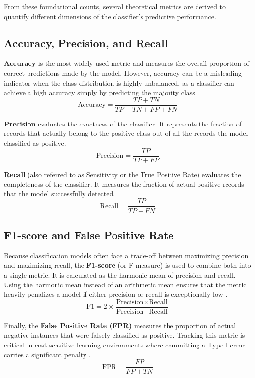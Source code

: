 From these foundational counts, several theoretical metrics are derived to quantify different dimensions of the classifier's predictive performance.

\subsection{Accuracy, Precision, and Recall}
\textbf{Accuracy} is the most widely used metric and measures the overall proportion of correct predictions made by the model. However, accuracy can be a misleading indicator when the class distribution is highly unbalanced, as a classifier can achieve a high accuracy simply by predicting the majority class \cite{tan2019introduction}.
\begin{equation}
    \text{Accuracy} = \frac{TP + TN}{TP + TN + FP + FN}
\end{equation}

\noindent \textbf{Precision} evaluates the exactness of the classifier. It represents the fraction of records that actually belong to the positive class out of all the records the model classified as positive.
\begin{equation}
    \text{Precision} = \frac{TP}{TP + FP}
\end{equation}

\noindent \textbf{Recall} (also referred to as Sensitivity or the True Positive Rate) evaluates the completeness of the classifier. It measures the fraction of actual positive records that the model successfully detected.
\begin{equation}
    \text{Recall} = \frac{TP}{TP + FN}
\end{equation}

\subsection{F1-score and False Positive Rate}
Because classification models often face a trade-off between maximizing precision and maximizing recall, the \textbf{F1-score} (or F-measure) is used to combine both into a single metric. It is calculated as the harmonic mean of precision and recall. Using the harmonic mean instead of an arithmetic mean ensures that the metric heavily penalizes a model if either precision or recall is exceptionally low \cite{tan2019introduction}.
\begin{equation}
    \text{F1} = 2 \times \frac{\text{Precision} \times \text{Recall}}{\text{Precision} + \text{Recall}}
\end{equation}

\noindent Finally, the \textbf{False Positive Rate (FPR)} measures the proportion of actual negative instances that were falsely classified as positive. Tracking this metric is critical in cost-sensitive learning environments where committing a Type I error carries a significant penalty \cite{tan2019introduction}.
\begin{equation}
    \text{FPR} = \frac{FP}{FP + TN}
\end{equation}